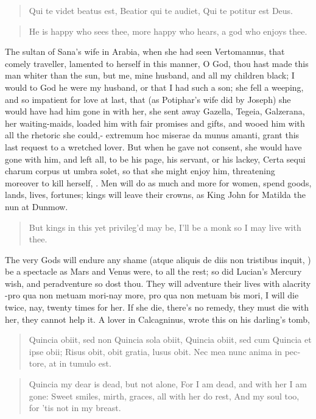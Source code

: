 \begin{latin}
\begin{verse}
Qui te videt beatus est,
Beatior qui te audiet,
Qui te potitur est Deus.
\end{verse}
\end{latin}
\translationrule%
\begin{verse}%
He is happy who sees thee,
more happy who hears,
a god who enjoys thee.
\end{verse}%

The sultan of Sana's wife in Arabia, when she had seen Vertomannus,
that comely traveller, lamented to herself in this manner, O God,
thou hast made this man whiter than the sun, but me, mine husband, and
all my children black; I would to God he were my husband, or that I had
such a son; she fell a weeping, and so impatient for love at last, that
(as Potiphar's wife did by Joseph) she would have had him gone in with
her, she sent away Gazella, Tegeia, Galzerana, her waiting-maids,
loaded him with fair promises and gifts, and wooed him with all the
rhetoric she could,- extremum hoc miserae da munus amanti, grant this
last request to a wretched lover. But when he gave not consent, she
would have gone with him, and left all, to be his page, his servant, or
his lackey, Certa sequi charum corpus ut umbra solet, so that she might
enjoy him, threatening moreover to kill herself, \etc{}. Men will do as
much and more for women, spend goods, lands, lives, fortunes; kings
will leave their crowns, as King John for Matilda the nun at Dunmow.

\begin{verse}%
But kings in this yet privileg'd may be,
I'll be a monk so I may live with thee.
\end{verse}%

The very Gods will endure any shame (atque aliquis de diis non
tristibus inquit, \etc{}) be a spectacle as Mars and Venus were, to all
the rest; so did Lucian's Mercury wish, and peradventure so dost thou.
They will adventure their lives with alacrity -pro qua non metuam
mori-nay more, pro qua non metuam bis mori, I will die twice, nay,
twenty times for her. If she die, there's no remedy, they must die with
her, they cannot help it. A lover in Calcagninus, wrote this on his
darling's tomb,

\begin{latin}
\begin{verse}
Quincia obiit, sed non Quincia sola obiit,
Quincia obiit, sed cum Quincia et ipse obii;
Risus obit, obit gratia, lusus obit.
Nec mea nunc anima in pectore, at in tumulo est.
\end{verse}
\end{latin}
\translationrule%
\begin{verse}%
Quincia my dear is dead, but not alone,
For I am dead, and with her I am gone:
Sweet smiles, mirth, graces, all with her do rest,
And my soul too, for 'tis not in my breast.
\end{verse}%

